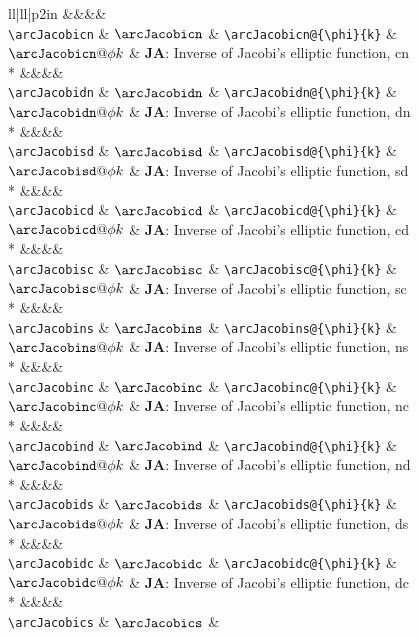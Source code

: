 \begin{supertabular}{ll|ll|p{2in}}
&&&&\\[-1ex]
\verb~\arcJacobicn~ & $\arcJacobicn$ & 
\verb~\arcJacobicn@{\phi}{k}~ & $\arcJacobicn@{\phi}{k}$ & 
\textbf{JA}: Inverse of Jacobi's elliptic function, cn\\*
&&&&\\[-1ex]
\verb~\arcJacobidn~ & $\arcJacobidn$ & 
\verb~\arcJacobidn@{\phi}{k}~ & $\arcJacobidn@{\phi}{k}$ & 
\textbf{JA}: Inverse of Jacobi's elliptic function, dn\\*
&&&&\\[-1ex]
\verb~\arcJacobisd~ & $\arcJacobisd$ & 
\verb~\arcJacobisd@{\phi}{k}~ & $\arcJacobisd@{\phi}{k}$ & 
\textbf{JA}: Inverse of Jacobi's elliptic function, sd\\*
&&&&\\[-1ex]
\verb~\arcJacobicd~ & $\arcJacobicd$ & 
\verb~\arcJacobicd@{\phi}{k}~ & $\arcJacobicd@{\phi}{k}$ & 
\textbf{JA}: Inverse of Jacobi's elliptic function, cd\\*
&&&&\\[-1ex]
\verb~\arcJacobisc~ & $\arcJacobisc$ & 
\verb~\arcJacobisc@{\phi}{k}~ & $\arcJacobisc@{\phi}{k}$ & 
\textbf{JA}: Inverse of Jacobi's elliptic function, sc\\*
&&&&\\[-1ex]
\verb~\arcJacobins~ & $\arcJacobins$ & 
\verb~\arcJacobins@{\phi}{k}~ & $\arcJacobins@{\phi}{k}$ & 
\textbf{JA}: Inverse of Jacobi's elliptic function, ns\\*
&&&&\\[-1ex]
\verb~\arcJacobinc~ & $\arcJacobinc$ & 
\verb~\arcJacobinc@{\phi}{k}~ & $\arcJacobinc@{\phi}{k}$ & 
\textbf{JA}: Inverse of Jacobi's elliptic function, nc\\*
&&&&\\[-1ex]
\verb~\arcJacobind~ & $\arcJacobind$ & 
\verb~\arcJacobind@{\phi}{k}~ & $\arcJacobind@{\phi}{k}$ & 
\textbf{JA}: Inverse of Jacobi's elliptic function, nd\\*
&&&&\\[-1ex]
\verb~\arcJacobids~ & $\arcJacobids$ & 
\verb~\arcJacobids@{\phi}{k}~ & $\arcJacobids@{\phi}{k}$ & 
\textbf{JA}: Inverse of Jacobi's elliptic function, ds\\*
&&&&\\[-1ex]
\verb~\arcJacobidc~ & $\arcJacobidc$ & 
\verb~\arcJacobidc@{\phi}{k}~ & $\arcJacobidc@{\phi}{k}$ & 
\textbf{JA}: Inverse of Jacobi's elliptic function, dc\\*
&&&&\\[-1ex]
\verb~\arcJacobics~ & $\arcJacobics$ & 

\end{supertabular}
